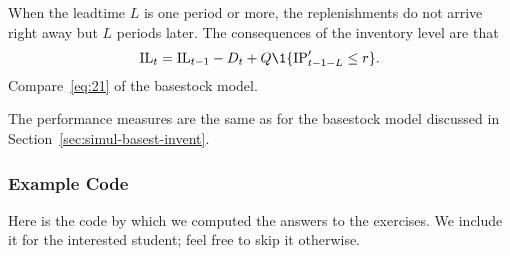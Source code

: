 When the leadtime $L$ is one period or more, the replenishments do not
arrive right away but $L$ periods later. The consequences of the
inventory level are that
\begin{equation}
  \IL_t = \IL_{t-1} - D_t + Q\1{\IP_{t-1-L}'\leq r}.
\end{equation}
Compare~\eqref{eq:21} of the basestock model.

The performance measures are the same as for the basestock model discussed in Section~\ref{sec:simul-basest-invent}.


\subsubsection{Example Code}
\label{sec:qr_example-code}

Here is the code by which we computed the answers to the exercises. We include it for the interested student; feel free to skip it otherwise.




